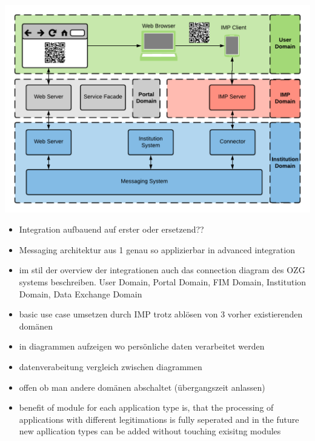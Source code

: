 \begin{center}
    \includegraphics[scale=0.6]{Diagrams/Integration Architecture 2/Overview.pdf}
\end{center}


\begin{itemize}
    
    \item Integration aufbauend auf erster oder ersetzend??
    
    \item Messaging architektur aus 1 genau so applizierbar in advanced integration
    
    \item im stil der overview der integrationen auch das connection diagram des OZG systems beschreiben. User Domain, Portal Domain, FIM Domain, Institution Domain, Data Exchange Domain
    
    \item basic use case umsetzen durch IMP trotz ablösen von 3 vorher existierenden domänen
    
    \item in diagrammen aufzeigen wo persönliche daten verarbeitet werden
    
    \item datenverabeitung vergleich zwischen diagrammen
    
    \item offen ob man andere domänen abschaltet (übergangszeit anlassen)
    
    \item benefit of module for each application type is, that the processing of applications with different legitimations is fully seperated and in the future new apllication types can be added without touching exisitng modules
\end{itemize}